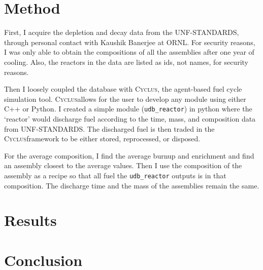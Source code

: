 \documentclass{article}
\newcommand{\Cyclus}{\textsc{Cyclus}}%
\begin{document}
\section{Method}
First, I acquire the depletion and decay data from the \gls{UNF-STANDARDS}, through
personal contact with Kaushik Banerjee at \gls{ORNL}. For security reasons, I was
only able to obtain the compositions of all the assemblies after one year of cooling.
Also, the reactors in the data are listed as ids, not names, for security reasons.

Then I loosely coupled the database with \Cyclus, the agent-based
fuel cycle simulation tool. \Cyclus allows for the user to develop any module using
either C++ or Python. I created a simple module (\texttt{udb\_reactor}) in python where the `reactor' would
discharge fuel according to the time, mass, and composition data from \gls{UNF-STANDARDS}.
The discharged fuel is then traded in the \Cyclus framework to be either stored,
reprocessed, or disposed.

For the average composition, I find the average burnup and enrichment and find an assembly
closest to the average values. Then I use the composition of the assembly as a recipe so that
all fuel the \texttt{udb\_reactor} outputs is in that composition. The discharge time
and the mass of the assemblies remain the same.


\section{Results}

\iffalse

\begin{figure}
        \centering
\begin{tikzpicture}[node distance=1.5cm]
\node (udbr) [object] {udb\_reactor};
\node (data) [object, right of=udbr] {\gls{UNF-STANDARDS} data (sql)};
\node (cyclus) [object, below of=udbr] {\Cyclus framework};

\draw [arrow] (udbr) -- (data)node[]{query}; 
\draw [arrow] (data) -- (udbr)node[]{time, mass, composition data}; 
\draw [arrow] (udbr) -- (cyclus)node[]{depleted assembly commodity};
\end{tikzpicture}
\caption{}
\label{diag:comp}
\end{figure}

\fi




\FloatBarrier

\section{Conclusion}



\end{document}
